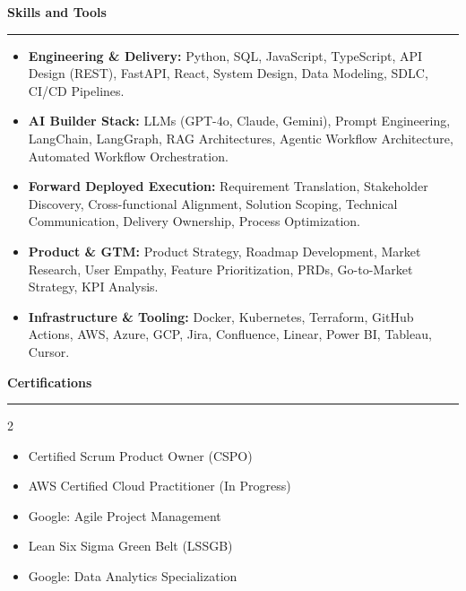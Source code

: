 \documentclass[9pt,letterpaper]{article} %
\newenvironment{rSection}[1]{ %
  \sectionskip
 \textbf{\Large #1} %
  \sectionlineskip
  \hrule %
  \begin{list}{}{ %
    \setlength{\leftmargin}{-0em} %
  }
  \item[]
}{
  \end{list}
}
\def\sectionlineskip{\smallskip} %
\def\sectionskip{} %
\begin{document}
\begin{rSection}{Skills and Tools}
\begin{itemize}[left=-1.5em, labelsep=.1cm, labelwidth=.2cm, itemsep=0.0em, topsep=0pt]
\item \textbf{Engineering \& Delivery:} Python, SQL, JavaScript, TypeScript, API Design (REST), FastAPI, React, System Design, Data Modeling, SDLC, CI/CD Pipelines.
\item \textbf{AI Builder Stack:} LLMs (GPT-4o, Claude, Gemini), Prompt Engineering, LangChain, LangGraph, RAG Architectures, Agentic Workflow Architecture, Automated Workflow Orchestration.
\item \textbf{Forward Deployed Execution:} Requirement Translation, Stakeholder Discovery, Cross-functional Alignment, Solution Scoping, Technical Communication, Delivery Ownership, Process Optimization.
\item \textbf{Product \& GTM:} Product Strategy, Roadmap Development, Market Research, User Empathy, Feature Prioritization, PRDs, Go-to-Market Strategy, KPI Analysis.
\item \textbf{Infrastructure \& Tooling:} Docker, Kubernetes, Terraform, GitHub Actions, AWS, Azure, GCP, Jira, Confluence, Linear, Power BI, Tableau, Cursor.
\end{itemize}
\end{rSection}%
\begin{rSection}{Certifications}
\begin{multicols}{2}
\begin{itemize}[left=-1.5em, labelsep=.1cm, labelwidth=.2cm, itemsep=0.0em, topsep=0pt]
\item Certified Scrum Product Owner (CSPO)
\item AWS Certified Cloud Practitioner (In Progress)
\item Google: Agile Project Management
\item Lean Six Sigma Green Belt (LSSGB)
\item Google: Data Analytics Specialization
\end{itemize}
\end{multicols}
\end{rSection}
\end{document}
